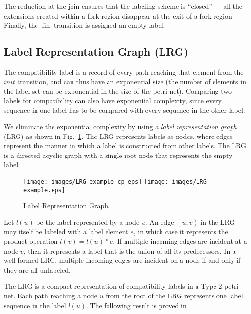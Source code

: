 \documentclass[conference]{IEEEtran}
\newcommand{\sym}[1]{$\operatorname{#1}$}
\begin{document}
The reduction at the join ensures that the labeling scheme is
``closed'' --- all the extensions created within a fork region
disappear at the exit of a fork region\cite{ahir_thesis}. Finally, the
\sym{fin} transition is assigned an empty label.

\subsection{Label Representation Graph (LRG)}

The compatibility label is a record of every path reaching that
element from the $init$ transition, and can thus have an exponential
size (the number of elements in the label set can be
exponential in the size of the petri-net). 
Comparing two labels for compatibility can also have exponential
complexity, since every sequence in one label has to be compared with
every sequence in the other label.

We eliminate the exponential complexity by using a {\em label representation
  graph} (LRG) as shown in Fig.~\ref{figure:LRG}. The LRG represents
labels as nodes, where edges represent the manner in which a label is
constructed from other labels. The LRG is a directed acyclic graph
with a single root node that represents the empty label.

\begin{figure}[!t]
  \centering
  \texttt{[image: images/LRG-example-cp.eps]}
  \hspace{0.125in}
  \texttt{[image: images/LRG-example.eps]}
  \caption{Label Representation Graph.}
  \label{figure:LRG}
\end{figure}

Let $l(u)$ be the label represented by a node $u$. An edge $(u,v)$ in
the LRG may itself be labeled with a label element $e$, in which case
it represents the product operation $l(v) = l(u) * e$. If multiple
incoming edges are incident at a node $v$, then it represents a label
that is the union of all its predecessors. In a well-formed LRG,
multiple incoming edges are incident on a node if and only if they are
all unlabeled.

The LRG is a compact representation of compatibility labels in a
Type-2 petri-net. Each path reaching a node $u$ from the root of the
LRG represents one label sequence in the label $l(u)$. The following
result is proved in \cite{ahir_thesis}.
\end{document}
